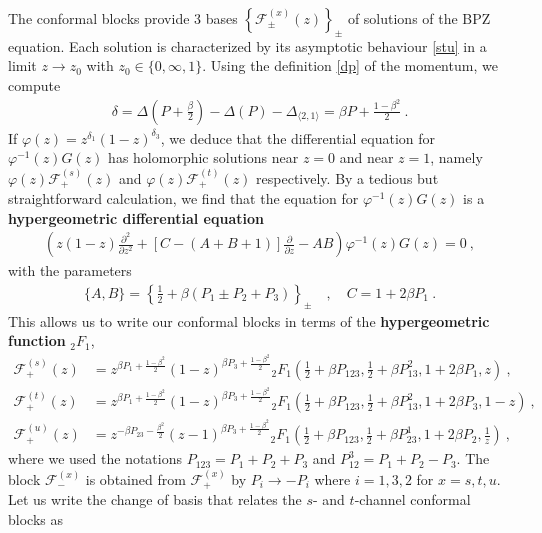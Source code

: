 \documentclass[12pt, a4paper]{article}
\newcommand{\myindex}[1]{\textbf{\boldmath #1}}
\theoremstyle{break}
\begin{document}
The conformal blocks provide 3 bases $\left\{\mathcal{F}^{(x)}_\pm(z)\right\}_\pm$ of solutions of the BPZ equation. Each solution is characterized by its asymptotic behaviour \eqref{stu} in a limit $z\to z_0$ with $z_0\in\{0,\infty,1\}$. Using the definition \eqref{dp} of the momentum, we compute 
\begin{align}
 \delta=\Delta\left(P+\tfrac{\beta}{2}\right) - \Delta(P) -\Delta_{\langle 2,1\rangle} = \beta P + \tfrac{1-\beta^2}{2}\ .
\end{align}
If $\varphi(z) = z^{\delta_1}(1-z)^{\delta_3}$, we deduce that the differential equation for $\varphi^{-1}(z) G(z)$ has holomorphic solutions near $z=0$ and near $z=1$, namely $\varphi(z)\mathcal{F}^{(s)}_+(z)$ and $\varphi(z)\mathcal{F}^{(t)}_+(z)$ respectively. By a tedious but straightforward calculation, we find that the equation for $\varphi^{-1}(z) G(z)$ is a \myindex{hypergeometric differential equation} 
\begin{align}
 \left(z(1-z)\frac{\partial^2}{\partial z^2} + \left[C-(A+B+1)\right]\frac{\partial}{\partial z} -AB\right) \varphi^{-1}(z) G(z) = 0 \ , 
\end{align}
with the parameters 
\begin{align}
 \{A,B\} = \left\{\tfrac12+\beta(P_1\pm P_2+P_3)\right\}_\pm \quad , \quad  C=1+2\beta P_1\ .
\end{align}
This allows us to write our conformal blocks in terms of the \myindex{hypergeometric function}  ${}_2F_1$,
\begin{align}
 \mathcal{F}_+^{(s)}(z) &= z^{\beta P_1 +\frac{1-\beta^2}{2}}(1-z)^{\beta P_3 + \frac{1-\beta^2}{2}} {}_2F_1\left(\tfrac12+ \beta P_{123},\tfrac12+\beta P_{13}^2,1+2\beta P_1,z\right) \ , 
 \\
 \mathcal{F}_+^{(t)}(z) &= z^{\beta P_1 +\frac{1-\beta^2}{2}}(1-z)^{\beta P_3 + \frac{1-\beta^2}{2}} {}_2F_1\left(\tfrac12+ \beta P_{123},\tfrac12+\beta P_{13}^2,1+2\beta P_3,1-z\right) \ , 
 \\
 \mathcal{F}_+^{(u)}(z) &= z^{-\beta P_{23} -\frac{\beta^2}{2}}(z-1)^{\beta P_3 + \frac{1-\beta^2}{2}} {}_2F_1\left(\tfrac12+ \beta P_{123},\tfrac12+\beta P_{23}^1,1+2\beta P_2,\tfrac{1}{z}\right) \ , 
\end{align}
where we used the notations $P_{123}=P_1+P_2+P_3$ and $P_{12}^3 = P_1+P_2-P_3$. The block $\mathcal{F}^{(x)}_-$ is obtained from $\mathcal{F}^{(x)}_+$ by $P_i\to -P_i$ where $i=1,3,2$ for $x=s,t,u$. 
Let us write 
the change of basis that relates the $s$- and $t$-channel conformal blocks as 
\end{document}
